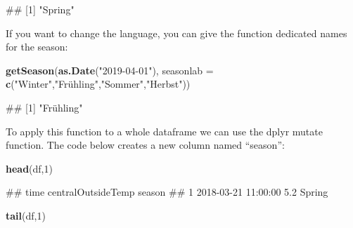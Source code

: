 \documentclass[
  a4paperpaper,
]{book}
\newenvironment{Shaded}{\begin{snugshade}}{\end{snugshade}}
\newcommand{\DataTypeTok}[1]{\textcolor[rgb]{0.13,0.29,0.53}{#1}}
\newcommand{\DecValTok}[1]{\textcolor[rgb]{0.00,0.00,0.81}{#1}}
\newcommand{\KeywordTok}[1]{\textcolor[rgb]{0.13,0.29,0.53}{\textbf{#1}}}
\newcommand{\NormalTok}[1]{#1}
\newcommand{\OperatorTok}[1]{\textcolor[rgb]{0.81,0.36,0.00}{\textbf{#1}}}
\newcommand{\StringTok}[1]{\textcolor[rgb]{0.31,0.60,0.02}{#1}}
\let\oldShaded\Shaded
\let\endoldShaded\endShaded
\renewenvironment{Shaded}{\footnotesize\oldShaded}{\endoldShaded}
\let\oldverbatim\verbatim
\let\endoldverbatim\endverbatim
\renewenvironment{verbatim}{\footnotesize\oldverbatim}{\endoldverbatim}
\begin{document}
\begin{verbatim}
## [1] "Spring"
\end{verbatim}

If you want to change the language, you can give the function dedicated names for the season:

\begin{Shaded}
\begin{Highlighting}[]
\KeywordTok{getSeason}\NormalTok{(}\KeywordTok{as.Date}\NormalTok{(}\StringTok{"2019-04-01"}\NormalTok{),}
                  \DataTypeTok{seasonlab =} \KeywordTok{c}\NormalTok{(}\StringTok{"Winter"}\NormalTok{,}\StringTok{"Frühling","}\NormalTok{Sommer}\StringTok{","}\NormalTok{Herbst}\StringTok{"))}
\end{Highlighting}
\end{Shaded}

\begin{verbatim}
## [1] "Frühling"
\end{verbatim}

To apply this function to a whole dataframe we can use the dplyr mutate function. The code below creates a new column named ``season'':

\begin{Shaded}
\end{Shaded}

\begin{Shaded}
\begin{Highlighting}[]
\KeywordTok{head}\NormalTok{(df,}\DecValTok{1}\NormalTok{)}
\end{Highlighting}
\end{Shaded}

\begin{verbatim}
##                  time centralOutsideTemp season
## 1 2018-03-21 11:00:00                5.2 Spring
\end{verbatim}

\begin{Shaded}
\begin{Highlighting}[]
\KeywordTok{tail}\NormalTok{(df,}\DecValTok{1}\NormalTok{)}
\end{Highlighting}
\end{Shaded}
\end{document}

